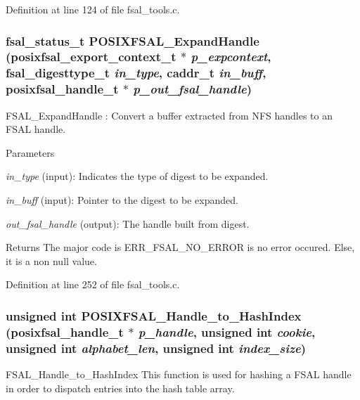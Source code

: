 Definition at line 124 of file fsal\_\-tools.c.
\subsubsection[{POSIXFSAL\_\-ExpandHandle}]{\setlength{\rightskip}{0pt plus 5cm}fsal\_\-status\_\-t POSIXFSAL\_\-ExpandHandle (posixfsal\_\-export\_\-context\_\-t $\ast$ {\em p\_\-expcontext}, \/  fsal\_\-digesttype\_\-t {\em in\_\-type}, \/  caddr\_\-t {\em in\_\-buff}, \/  posixfsal\_\-handle\_\-t $\ast$ {\em p\_\-out\_\-fsal\_\-handle})}\label{fsal__tools_8c_a45eaa2cbdc441d03d1ff332c077fec55}
FSAL\_\-ExpandHandle : Convert a buffer extracted from NFS handles to an FSAL handle.


\begin{DoxyParams}{Parameters}
\item[{\em in\_\-type}](input): Indicates the type of digest to be expanded. \item[{\em in\_\-buff}](input): Pointer to the digest to be expanded. \item[{\em out\_\-fsal\_\-handle}](output): The handle built from digest.\end{DoxyParams}
\begin{DoxyReturn}{Returns}
The major code is ERR\_\-FSAL\_\-NO\_\-ERROR is no error occured. Else, it is a non null value. 
\end{DoxyReturn}


Definition at line 252 of file fsal\_\-tools.c.
\subsubsection[{POSIXFSAL\_\-Handle\_\-to\_\-HashIndex}]{\setlength{\rightskip}{0pt plus 5cm}unsigned int POSIXFSAL\_\-Handle\_\-to\_\-HashIndex (posixfsal\_\-handle\_\-t $\ast$ {\em p\_\-handle}, \/  unsigned int {\em cookie}, \/  unsigned int {\em alphabet\_\-len}, \/  unsigned int {\em index\_\-size})}\label{fsal__tools_8c_aa712ec523b7817a56f1a9f3f3182143a}
FSAL\_\-Handle\_\-to\_\-HashIndex This function is used for hashing a FSAL handle in order to dispatch entries into the hash table array.


